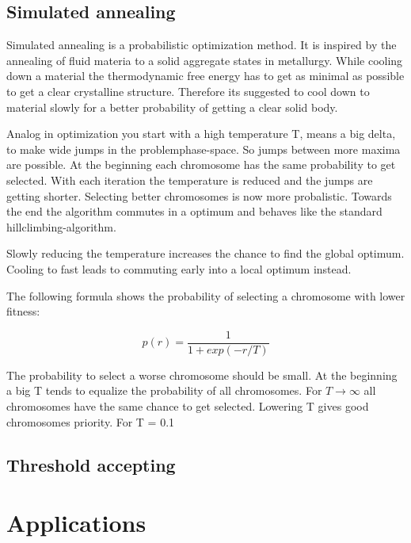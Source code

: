 \documentclass[10pt,a4paper,DIV=11]{scrreprt}
\begin{document}
\subsection{Simulated annealing}
Simulated annealing is a probabilistic optimization method.
It is inspired by the annealing of fluid materia to a solid aggregate states in metallurgy. While cooling down a material the thermodynamic free energy has to get as minimal as possible to get a clear crystalline structure. Therefore its suggested to cool down to material slowly for a better probability of getting a clear solid body.

Analog in optimization you start with a high temperature T, means a big delta, to make wide jumps in the problemphase-space. So jumps between more maxima are possible. At the beginning each chromosome has the same probability to get selected. With each iteration the temperature is reduced and the jumps are getting shorter. Selecting better chromosomes is now more probalistic.
Towards the end the algorithm commutes in a optimum and behaves like the standard hillclimbing-algorithm.

Slowly reducing the temperature increases the chance to find the global optimum. Cooling to fast leads to commuting early into a local optimum instead.

The following formula shows the probability of selecting a chromosome with lower fitness:

\begin{equation}
p(r) = \frac{1}{1+exp(-r/T)}
\end{equation} 

The probability to select a worse chromosome should be small.
At the beginning a big T tends to equalize the probability of all chromosomes. For $T \to \infty$ all chromosomes have the same chance to get selected. Lowering T gives good chromosomes priority. For T = 0.1

\subsection{Threshold accepting}

\section{Applications}

\end{document}
